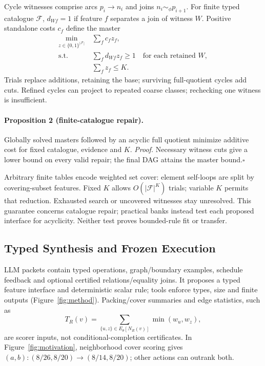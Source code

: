 Cycle witnesses comprise arcs $p_i\to n_i$ and joins
$n_i\sim_\phi p_{i+1}$. For finite typed catalogue $\mathcal F$,
$d_{Wf}=1$ if feature $f$ separates a join of witness $W$. Positive
standalone costs $c_f$ define the master
\begin{equation}
 \begin{split}
 \min_{z\in\{0,1\}^{|\mathcal F|}}\ &\sum_f c_fz_f,\\
 \text{s.t. }&\sum_f d_{Wf}z_f\geq1\quad\text{for each retained }W,\\
 &\sum_f z_f\leq K.
 \end{split}
 \label{eq:repair-cover}
\end{equation}
Trials replace additions, retaining the base; surviving full-quotient
cycles add cuts. Refined cycles can project to repeated coarse classes;
rechecking one witness is insufficient.

\paragraph{Proposition 2 (finite-catalogue repair).}
Globally solved masters followed by an acyclic full quotient minimize
additive cost for fixed catalogue, evidence and $K$.
\emph{Proof.} Necessary witness cuts give a lower bound on every valid
repair; the final DAG attains the master bound.\hfill$\square$

Arbitrary finite tables encode weighted set cover: element self-loops
are split by covering-subset features. Fixed $K$ allows $O(|\mathcal F|^K)$
trials; variable $K$ permits that reduction. Exhausted search or
uncovered witnesses stay unresolved. This guarantee concerns catalogue
repair; practical banks instead test each proposed interface for acyclicity.
Neither test proves bounded-rule fit or transfer.

\subsection{Typed Synthesis and Frozen Execution}
\label{sec:method:features}
LLM packets contain typed operations, graph/boundary examples, schedule
feedback and optional certified relations/equality joins. It proposes a typed
feature interface and deterministic scalar rule; tools enforce types,
size and finite outputs (Figure~\ref{fig:method}). Packing/cover summaries
and edge statistics, such as
\begin{equation}
 T_R(v)=\sum_{\{u,z\}\in E_\theta[N_R(v)]}\min(w_u,w_z),
 \label{eq:neighbor-structure}
\end{equation}
are scorer inputs, not conditional-completion certificates.
In Figure~\ref{fig:motivation}, neighborhood cover scoring gives
$(a,b):(8/26,8/20)\to(8/14,8/20)$; other actions can outrank both.

